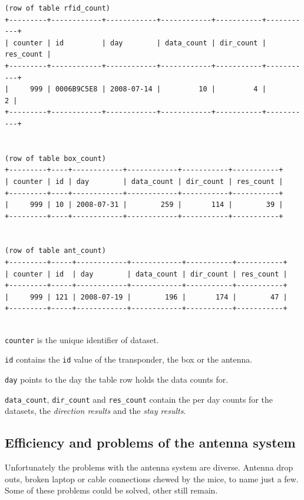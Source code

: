 \codescript
{}
\begin{lstlisting}[frame=none]
(row of table rfid_count)
+---------+------------+------------+------------+-----------+-----------+
| counter | id         | day        | data_count | dir_count | res_count |
+---------+------------+------------+------------+-----------+-----------+
|     999 | 0006B9C5E8 | 2008-07-14 |         10 |         4 |         2 | 
+---------+------------+------------+------------+-----------+-----------+


(row of table box_count)
+---------+----+------------+------------+-----------+-----------+
| counter | id | day        | data_count | dir_count | res_count |
+---------+----+------------+------------+-----------+-----------+
|     999 | 10 | 2008-07-31 |        259 |       114 |        39 | 
+---------+----+------------+------------+-----------+-----------+


(row of table ant_count)
+---------+-----+------------+------------+-----------+-----------+
| counter | id  | day        | data_count | dir_count | res_count |
+---------+-----+------------+------------+-----------+-----------+
|     999 | 121 | 2008-07-19 |        196 |       174 |        47 | 
+---------+-----+------------+------------+-----------+-----------+


\end{lstlisting}

\begin{mydesc}
	\item \lstinline|counter| is the unique identifier of dataset.
	\item \lstinline|id| contains the \lstinline|id| value of the transponder, the box or the antenna.
	\item \lstinline|day| points to the day the table row holds the data counts for.
	\item \lstinline|data_count|, \lstinline|dir_count| and \lstinline|res_count| contain the per day counts for the datasets, the \textit{direction results} and the \textit{stay results}.
\end{mydesc}

\subsection{Efficiency and problems of the antenna system}
\label{subsec:problems}

Unfortunately the problems with the antenna system are diverse. Antenna drop outs, broken laptop or cable connections chewed by the mice, to name just a few. Some of these problems could be solved, other still remain.

